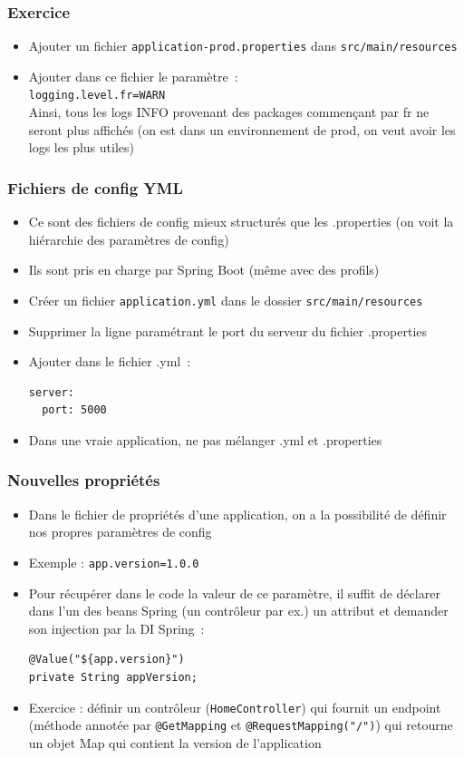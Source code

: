 \documentclass{beamer}
\begin{document}
\begin{frame}[fragile]
	\frametitle{Exercice}
	\begin{itemize}
		\item Ajouter un fichier \texttt{application-prod.properties} dans \texttt{src/main/resources}
		\item Ajouter dans ce fichier le paramètre~:\\
		\texttt{logging.level.fr=WARN}\\
		Ainsi, tous les logs INFO provenant des packages commençant par fr ne seront plus affichés (on est dans un environnement de prod, on veut avoir les logs les plus utiles)
	\end{itemize}
\end{frame}

\begin{frame}[fragile]
	\frametitle{Fichiers de config YML}
	\begin{itemize}
		\item Ce sont des fichiers de config mieux structurés que les .properties (on voit la hiérarchie des paramètres de config)
		\item Ils sont pris en charge par Spring Boot (même avec des profils)
		\item Créer un fichier \texttt{application.yml} dans le dossier \texttt{src/main/resources}
		\item Supprimer la ligne paramétrant le port du serveur du fichier .properties
		\item Ajouter dans le fichier .yml~:\\
\begin{lstlisting}
server:
  port: 5000	
\end{lstlisting}
\item Dans une vraie application, ne pas mélanger .yml et .properties
	\end{itemize}
\end{frame} 

\begin{frame}[fragile]
	\frametitle{Nouvelles propriétés}
	\begin{itemize}
		\item Dans le fichier de propriétés d'une application, on a la possibilité de définir nos propres paramètres de config 
		\item Exemple : \texttt{app.version=1.0.0} 
		\item Pour récupérer dans le code la valeur de ce paramètre, il suffit de déclarer dans l'un des beans Spring (un contrôleur par ex.) un attribut et demander son injection par la DI Spring~:
\begin{lstlisting}
@Value("${app.version}")
private String appVersion;
\end{lstlisting} 
\item Exercice : définir un contrôleur (\texttt{HomeController}) qui fournit un endpoint (méthode annotée par \texttt{@GetMapping} et \texttt{@RequestMapping("/")}) qui retourne un objet Map qui contient la version de l'application 
	\end{itemize}
\end{frame} 
\end{document}
